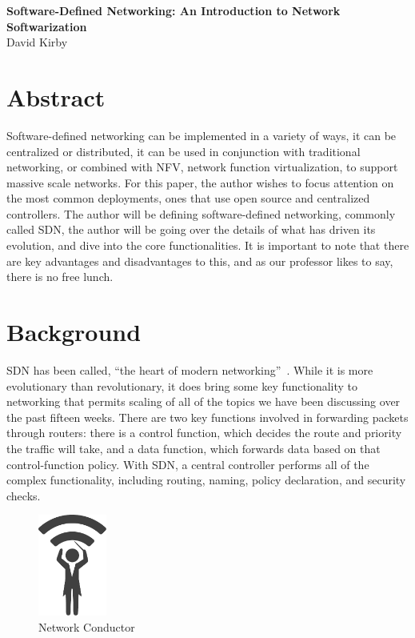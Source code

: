 \documentclass[11pt]{article}
\begin{document}
 	\begin{center}
	\Large{\bfseries Software-Defined Networking: An Introduction to Network Softwarization}\\[1em]
	\large{David Kirby}\\
	\end{center}

\section{Abstract}

Software-defined networking can be implemented in a variety of ways, it can be centralized or distributed, it can be used in conjunction with traditional networking, or combined with NFV, network function virtualization, to support massive scale networks. For this paper, the author wishes to focus attention on the most common deployments, ones that use open source and centralized controllers. The author will be defining software-defined networking, commonly called SDN, the author will be going over the details of what has driven its evolution, and dive into the core functionalities. It is important to note that there are key advantages and disadvantages to this, and as our professor likes to say, there is no free lunch.

\section{Background}

SDN has been called, “the heart of modern networking”~\cite{Stallings}. While it is more evolutionary than revolutionary, it does bring some key functionality to networking that permits scaling of all of the topics we have been discussing over the past fifteen weeks. There are two key functions involved in forwarding packets through routers: there is a control function, which decides the route and priority the traffic will take, and a data function, which forwards data based on that control-function policy. With SDN, a central controller performs all of the complex functionality, including routing, naming, policy declaration, and security checks.\par

\begin{figure}
	\includegraphics[width=0.2\textwidth]{NetworkConductor}
	\caption{Network Conductor}
\end{figure}
\end{document}
